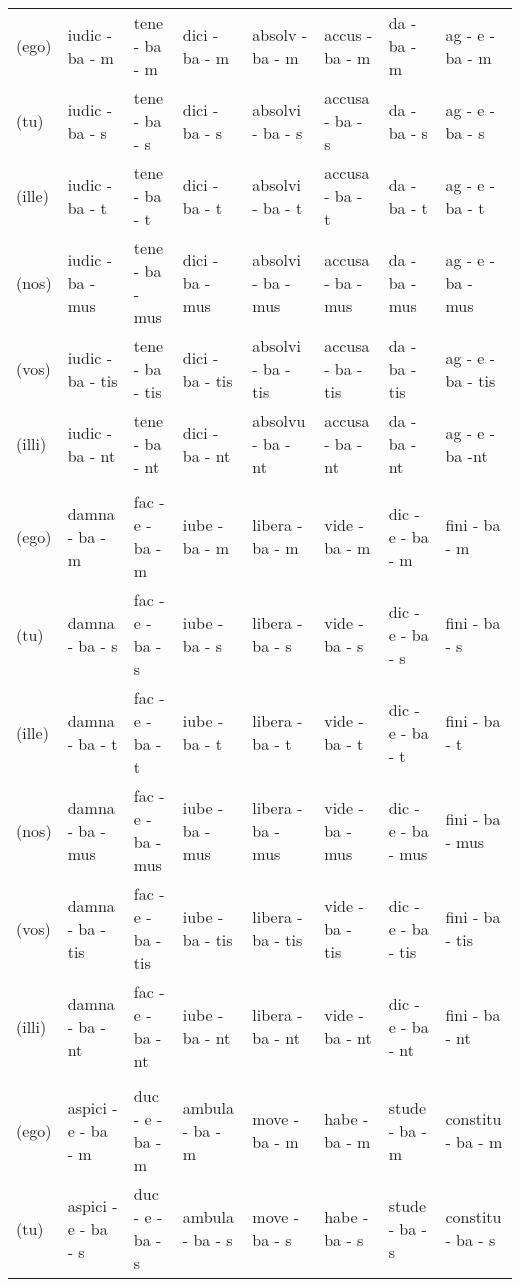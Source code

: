\documentclass[a4paper, landscape]{article}
\begin{document}
\begin{landscape}
\begin{table}[]
\begin{tabular}{llllllll}
	(ego)	& iudic - ba - m   & tene - ba - m	 & dici - ba - m   & absolv - ba - m	& accus  - ba - m   & da - ba - m	& ag - e - ba - m \\ 
	(tu)	& iudic - ba - s   & tene - ba - s 	 & dici - ba - s   & absolvi - ba - s	& accusa - ba - s   & da - ba - s	& ag - e - ba - s \\
	(ille)	& iudic - ba - t   & tene - ba - t	 & dici - ba - t   & absolvi - ba - t	& accusa - ba - t   & da - ba - t	& ag - e - ba - t \\
	(nos)	& iudic - ba - mus & tene - ba - mus & dici - ba - mus & absolvi - ba - mus & accusa - ba - mus & da - ba - mus	& ag - e - ba - mus \\
	(vos)	& iudic - ba - tis & tene - ba - tis & dici - ba - tis & absolvi - ba - tis & accusa - ba - tis & da - ba - tis	& ag - e - ba - tis \\
	(illi)	& iudic - ba - nt  & tene - ba - nt  & dici - ba - nt  & absolvu - ba - nt	& accusa - ba - nt  & da - ba - nt	& ag - e - ba -nt \\
	& & & &  &  &  & \\
	(ego)	& damna - ba - m	& fac - e - ba - m		& iube - ba - m   & libera - ba - m   & vide - ba - m   & dic - e - ba - m	 & fini - ba - m  \\ 
	(tu)	& damna - ba - s	& fac - e - ba - s		& iube - ba - s	  & libera - ba - s   & vide - ba - s	& dic - e - ba - s	 & fini - ba - s \\
	(ille)	& damna - ba - t	& fac - e - ba - t		& iube - ba - t	  & libera - ba - t   & vide - ba - t	& dic - e - ba - t 	 & fini - ba - t  \\
	(nos)	& damna - ba - mus	& fac - e - ba - mus	& iube - ba - mus & libera - ba - mus & vide - ba - mus & dic - e - ba - mus & fini - ba - mus \\
	(vos)	& damna - ba - tis	& fac - e - ba - tis	& iube - ba - tis & libera - ba - tis & vide - ba - tis & dic - e - ba - tis & fini - ba - tis \\
	(illi)	& damna - ba - nt	& fac - e - ba - nt 	& iube - ba - nt  & libera - ba - nt  & vide - ba - nt  & dic - e - ba - nt	 & fini - ba - nt \\
	& & & &  &  &  & \\
	(ego)   & aspici - e - ba - m		& duc - e - ba - m		& ambula - ba - m	& move - ba - m		& habe - ba - m		& stude - ba - m    & constitu - ba - m \\
	(tu)	& aspici - e - ba - s		& duc - e - ba - s		& ambula - ba - s	& move - ba - s		& habe - ba - s		& stude - ba - s	& constitu - ba - s \\

\end{tabular}
\end{table}
\end{landscape}
\end{document}
